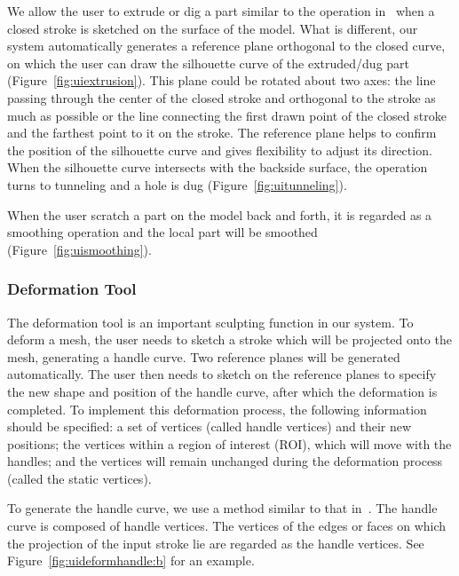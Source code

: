 We allow the user to extrude or dig a part similar to the operation in~\cite{IMT99,NISA07} when a closed stroke is sketched on the surface of the model. What is different, our system automatically generates a reference plane orthogonal to the closed curve, on which the user can draw the silhouette curve of the extruded/dug part (Figure~\ref{fig:uiextrusion}). This plane could be rotated about two axes: the line passing through the center of the 
closed stroke and orthogonal to the stroke as much as possible or the line connecting the first drawn point of the closed stroke and the farthest point to it on the stroke. The reference plane helps to confirm the position of the silhouette curve and gives flexibility to adjust its direction. When the silhouette curve intersects with the backside surface, the operation turns to tunneling and a hole is dug (Figure~\ref{fig:uitunneling}). 

When the user scratch a part on the model back and forth, it is regarded as a smoothing operation and the local part will be smoothed (Figure~\ref{fig:uismoothing}).


\subsubsection{Deformation Tool}\label{ch3:sec:ui:deformation}

The deformation tool is an important sculpting function in our system. To deform a mesh, the user needs to sketch a stroke which will be projected onto the mesh, generating a handle curve. Two reference planes will be generated automatically. The user then needs to sketch on the reference planes to specify the new shape and position of the handle curve, after which the deformation is completed. To implement this deformation process, the following information should be specified: a set of vertices (called handle vertices) and their new positions; the vertices within a region of interest (ROI), which will move with the handles; and the vertices will remain unchanged during the deformation process (called the static vertices).

To generate the handle curve, we use a method similar to that in~\cite{NSAC05}. The handle curve is composed of handle vertices. The vertices of the edges or faces on which the projection of the input stroke lie are regarded as the handle vertices. See Figure~\ref{fig:uideformhandle:b} for an example.

